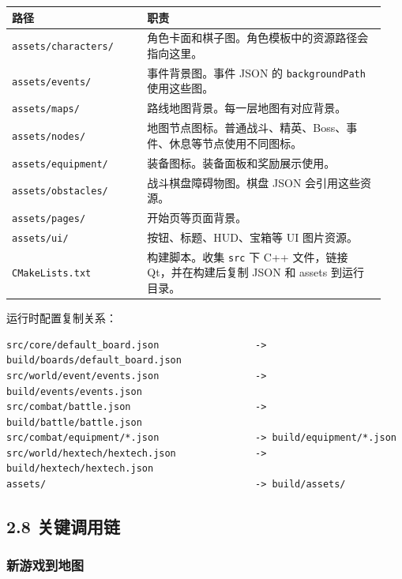 \documentclass[UTF8,10pt]{ctexart}
\begin{document}
{\small
\begin{longtable}{p{0.34\linewidth}p{0.60\linewidth}}
\toprule
\textbf{路径} & \textbf{职责} \\
\midrule
\texttt{assets/\allowbreak{}characters/\allowbreak{}} & 角色卡面和棋子图。角色模板中的资源路径会指向这里。 \\
\texttt{assets/\allowbreak{}events/\allowbreak{}} & 事件背景图。事件 JSON 的 \texttt{backgroundPath} 使用这些图。 \\
\texttt{assets/\allowbreak{}maps/\allowbreak{}} & 路线地图背景。每一层地图有对应背景。 \\
\texttt{assets/\allowbreak{}nodes/\allowbreak{}} & 地图节点图标。普通战斗、精英、Boss、事件、休息等节点使用不同图标。 \\
\texttt{assets/\allowbreak{}equipment/\allowbreak{}} & 装备图标。装备面板和奖励展示使用。 \\
\texttt{assets/\allowbreak{}obstacles/\allowbreak{}} & 战斗棋盘障碍物图。棋盘 JSON 会引用这些资源。 \\
\texttt{assets/\allowbreak{}pages/\allowbreak{}} & 开始页等页面背景。 \\
\texttt{assets/\allowbreak{}ui/\allowbreak{}} & 按钮、标题、HUD、宝箱等 UI 图片资源。 \\
\texttt{CMakeLists.\allowbreak{}txt} & 构建脚本。收集 \texttt{src} 下 C++ 文件，链接 Qt，并在构建后复制 JSON 和 assets 到运行目录。 \\
\bottomrule
\end{longtable}
}

运行时配置复制关系：

\begin{lstlisting}
src/core/default_board.json                 -> build/boards/default_board.json
src/world/event/events.json                 -> build/events/events.json
src/combat/battle.json                      -> build/battle/battle.json
src/combat/equipment/*.json                 -> build/equipment/*.json
src/world/hextech/hextech.json              -> build/hextech/hextech.json
assets/                                     -> build/assets/
\end{lstlisting}

\subsection*{2.8 关键调用链}

\subsubsection*{新游戏到地图}
\end{document}
